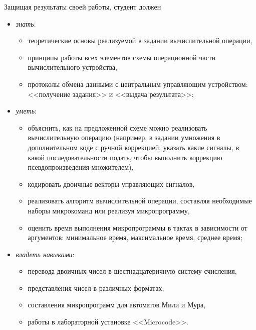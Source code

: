 Защищая результаты своей работы, студент должен
\begin{itemize}
    \item \emph{знать}:
    \begin{itemize}
        \item теоретические основы реализуемой в задании вычислительной операции,
        \item принципы работы всех элементов схемы операционной части вычислительного устройства,
        \item протоколы обмена данными с центральным управляющим устройством: <<получение задания>> и <<выдача результата>>;
    \end{itemize}
    \item \emph{уметь}: 
    \begin{itemize}
        \item объяснить, как на предложенной схеме можно реализовать вычислительную операцию (например, в задании умножения в дополнительном коде с ручной коррекцией, указать какие сигналы, в какой последовательности подать, чтобы выполнить коррекцию псевдопроизведения множителем),
        \item кодировать двоичные векторы управляющих сигналов,
        \item реализовать алгоритм вычислительной операции, составляя необходимые наборы микрокоманд или реализуя  микропрограмму,
        \item оценить время выполнения микропрограммы в тактах в зависимости от аргументов: минимальное время, максимальное время, среднее время;
    \end{itemize}
    \item \emph{владеть навыками}:
    \begin{itemize}
        \item перевода двоичных чисел в шестнадцатеричную систему счисления, 
        \item представления чисел в различных форматах, 
        \item составления микропрограмм для автоматов Мили и Мура, 
        \item работы в лабораторной установке <<Microcode>>. 
    \end{itemize}
\end{itemize}

